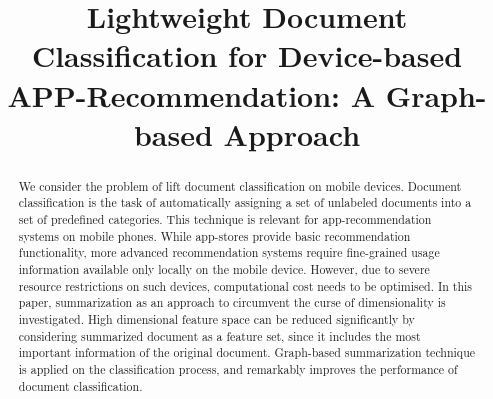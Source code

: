 \documentclass{sigchi}
\def\plaintitle{Lightweight Document Classification for Device-based APP-Recommendation: A Graph-based Approach}
\begin{document}
\title{\plaintitle}

\author{%
}

\maketitle

\begin{abstract}
We consider the problem of lift document classification on mobile devices.
Document classification is the task of automatically assigning a set of unlabeled documents into a set of predefined categories.
This technique is relevant for app-recommendation systems on mobile phones. 
While app-stores provide basic recommendation functionality, more advanced recommendation systems require fine-grained usage information available only locally on the mobile device. 
However, due to severe resource restrictions on such devices, computational cost needs to be optimised. 
In this paper, summarization as an approach to circumvent the curse of dimensionality is investigated. 
High dimensional feature space can be reduced significantly by considering summarized document as a feature set, since it includes the most important information of the original document. 
Graph-based summarization technique is applied on the classification process, and remarkably improves the performance of document classification.
\end{abstract}

 
\end{document}
